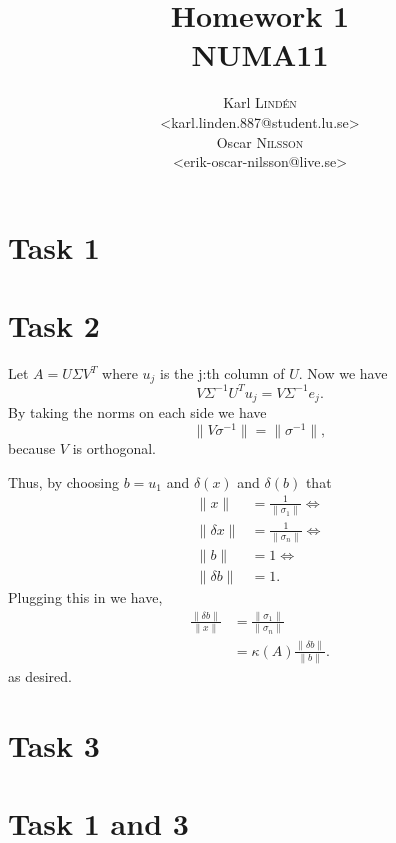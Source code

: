 \documentclass[a4paper,12pt]{article}
\begin{document}
\title{Homework 1 \\ NUMA11}
\author{
  Karl \textsc{Lind\'{e}n} \\
  <karl.linden.887@student.lu.se> \\
  Oscar \textsc{Nilsson} \\
  <erik-oscar-nilsson@live.se>
}

\maketitle
\thispagestyle{empty}

\newpage

\section*{Task 1}

\section*{Task 2}
Let \( A = U \Sigma V^T \) where \(u_j\) is the j:th column of \( 
U\). Now we have 
\[ V \Sigma^{-1}U^T u_j = V \Sigma^{-1} e_j. \]
By taking the norms on each side we have
\[ \|V \sigma^{-1} \| = \| \sigma^{-1} \|, \]
because \( V \) is orthogonal.

Thus, by choosing \( b = u_1\) and \( \delta(x)\) and \(\delta(b) \) 
that 
\begin{align*}
\| x \| &= \frac{1}{\| \sigma_1 \| } \Leftrightarrow\\
\|\delta x\| &= \frac{1}{\| \sigma_n \| } \Leftrightarrow\\
\|b\| &= 1 \Leftrightarrow\\
\|\delta b\| &= 1.
\end{align*}
Plugging this in we have,
\begin{align*}
\frac{\|\delta b\|}{\| x\|} &= \frac{\|\sigma_1\|}{\|\sigma_n\|}\\
&= \kappa(A) \frac{\| \delta b\|}{\|b\|}.
\end{align*}
as desired.

\section*{Task 3}

\appendix
\section*{Task 1 and 3}

\end{document}
